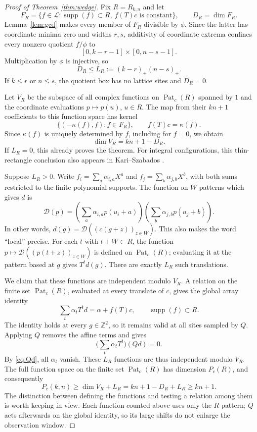 \documentclass[11pt]{article}
\numberwithin{equation}{section}
\theoremstyle{definition}
\theoremstyle{remark}
\newcommand{\Z}{\mathbb Z}
\newcommand{\supp}{\operatorname{supp}}
\newcommand{\Pat}{\operatorname{Pat}}
\newcommand{\Laur}{\mathscr L}
\newcommand{\Rect}{R_{k,n}}
\begin{document}
\begin{proof}[Proof of Theorem~\ref{thm:wedge}]
Fix $R=\Rect$ and let
\[
 F_R=\{f\in\Laur:\supp(f)\subset R,\ f(T)c\text{ is constant}\},\qquad D_R=\dim F_R.
\]
Lemma~\ref{lem:gcd} makes every member of $F_R$ divisible by $\phi$. Since the latter has coordinate
minima zero and widths $r,s$, additivity of coordinate extrema confines every nonzero quotient
$f/\phi$ to
\[
 [0,k-r-1]\times[0,n-s-1].
\]
Multiplication by $\phi$ is injective, so
\begin{equation}\label{eq:relation-count}
 D_R\le L_R:=(k-r)_+(n-s)_+.
\end{equation}
If $k\le r$ or $n\le s$, the quotient box has no lattice sites and $D_R=0$.

Let $V_R$ be the subspace of all complex functions on $\Pat_c(R)$ spanned by $1$ and the coordinate
evaluations $p\mapsto p(u)$, $u\in R$. The map from their $kn+1$ coefficients to this function space
has kernel
\[
 \{(-\kappa(f),f):f\in F_R\},\qquad f(T)c=\kappa(f).
\]
Since $\kappa(f)$ is uniquely determined by $f$, including for $f=0$, we obtain
\begin{equation}\label{eq:affine-count}
 \dim V_R=kn+1-D_R.
\end{equation}
If $L_R=0$, this already proves the theorem. For integral configurations, this thin-rectangle
conclusion also appears in Kari--Szabados \cite[Lemma~39]{KS}.

Suppose $L_R>0$. Write $f_i=\sum_a\alpha_{i,a}X^a$ and
$f_j=\sum_b\alpha_{j,b}X^b$, with both sums restricted to the finite polynomial supports. The
function on $W$-patterns which gives $d$ is
\[
 \mathcal D(p)=
 \left(\sum_a\alpha_{i,a}p(u_i+a)\right)
 \left(\sum_b\alpha_{j,b}p(u_j+b)\right).
\]
In other words, $d(g)=\mathcal D((c(g+z))_{z\in W})$. This also makes the word ``local'' precise.
For each $t$ with $t+W\subset R$, the function
$p\mapsto\mathcal D((p(t+z))_{z\in W})$ is defined on $\Pat_c(R)$; evaluating it at the pattern
based at $g$ gives $T^td(g)$. There are exactly $L_R$ such translations.

We claim that these functions are independent modulo $V_R$. A relation on the finite set
$\Pat_c(R)$, evaluated at every translate of $c$, gives the global array identity
\[
 \sum_t\alpha_t T^td=\alpha+f(T)c,\qquad \supp(f)\subset R.
\]
The identity holds at every $g\in\Z^2$, so it remains valid at all sites sampled by $Q$.
Applying $Q$ removes the affine terms and gives
\[
 \Big(\sum_t\alpha_tT^t\Big)(Qd)=0.
\]
By \eqref{eq:Qd}, all $\alpha_t$ vanish. These $L_R$ functions are thus independent modulo $V_R$.
The full function space on the finite set $\Pat_c(R)$ has dimension $P_c(R)$, and consequently
\[
 P_c(k,n)\ge\dim V_R+L_R
 =kn+1-D_R+L_R\ge kn+1.
\]
The distinction between defining the functions and testing a relation among them is worth keeping
in view. Each function counted above uses only the $R$-pattern; $Q$ acts afterwards on the global
identity, so its large shifts do not enlarge the observation window.
\end{proof}
\end{document}
